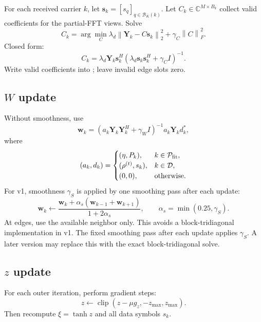 \documentclass[11pt]{article}
\newcommand{\C}{\mathbb{C}}
\newcommand{\norm}[1]{\left\lVert #1 \right\rVert}
\newcommand{\code}[1]{\texttt{\detokenize{#1}}}
\begin{document}
For each received carrier $k$, let $\mathbf s_k=[s_q]_{q\in\mathcal B_K(k)}$. Let $C_k\in\C^{M\times B_k}$ collect valid coefficients for the partial-FFT views. Solve
\begin{equation}
C_k=\arg\min_C\lambda_d\norm{\mathbf Y_k-C\mathbf s_k}_2^2+\gamma_C\norm C_F^2.
\end{equation}
Closed form:
\begin{equation}
C_k=\lambda_d\mathbf Y_k\mathbf s_k^H\left(\lambda_d\mathbf s_k\mathbf s_k^H+\gamma_C I\right)^{-1}.
\end{equation}
Write valid coefficients into \code{C[k, off, m]}; leave invalid edge slots zero.

\subsection{$W$ update}

Without smoothness, use
\begin{equation}
\mathbf w_k=\left(a_k\mathbf Y_k\mathbf Y_k^H+\gamma_W I\right)^{-1}a_k\mathbf Y_k d_k^*,
\end{equation}
where
\begin{equation}
(a_k,d_k)=\begin{cases}
(\eta,P_k),&k\in\mathcal P_{\rm fit},\\
(\rho^{(t)},s_k),&k\in\mathcal D,\\
(0,0),&\text{otherwise.}
\end{cases}
\end{equation}
For v1, smoothness $\gamma_S$ is applied by one smoothing pass after each update:
\begin{equation}
\mathbf w_k\leftarrow \frac{\mathbf w_k+\alpha_s(\mathbf w_{k-1}+\mathbf w_{k+1})}{1+2\alpha_s},
\qquad
\alpha_s=\min(0.25,\gamma_S).
\end{equation}
At edges, use the available neighbor only. This avoids a block-tridiagonal implementation in v1. The fixed smoothing pass after each update applies $\gamma_S$. A later version may replace this with the exact block-tridiagonal solve.

\subsection{$z$ update}

For each outer iteration, perform \code{z_steps_per_outer} gradient steps:
\begin{equation}
z\leftarrow \operatorname{clip}(z-\mu g_z,-z_{\max},z_{\max}).
\end{equation}
Then recompute $\xi=\tanh z$ and all data symbols $s_k$.
\end{document}
